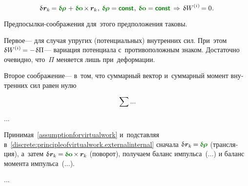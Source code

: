 \begin{otherlanguage}{russian}
\nopagebreak\vspace{-0.2em}\begin{equation}\label{assumptionforvirtualwork}
\variation{\hspace{.1ex}\bm{r}_k} \hspace{-0.16ex}
= \constvarvector{\hspace{-0.1ex}\bm{\rho}} \hspace{.2ex} + \hspace{.12ex} \constvarvector{\bm{o}} \hspace{-0.2ex} \times \hspace{-0.1ex} \bm{r}_k
\hspace{.1ex} , \:
\constvarvector{\hspace{-0.1ex}\bm{\rho}} = \boldconst \hspace{.1ex} , \:
\constvarvector{\bm{o}} = \boldconst
\hspace{.4ex} \Rightarrow \hspace{.32ex}
\variation{\internalwork} \hspace{-0.1ex} = 0 \hspace{.1ex}.
\end{equation}

\vspace{-0.1em} Предпосылки-соображения для~этого предположения таковы.

Первое\:--- для случая упругих (потенциальных) внутренних сил. При~этом ${\variation{\internalwork} = - \hspace{.16ex} \variation{\Pi}}$\:--- вариация потенциала с~противоположным знаком. Достаточно очевидно, что~$\Pi$ меняется лишь при~деформации.

Второе соображение\:--- в~том, что суммарный вектор и~суммарный момент внутренних сил равен нулю

\begin{equation*}
\sum \ldots
\end{equation*}

...

Принимая~\eqref{assumptionforvirtualwork} и~подставляя в~\eqref{discrete:principleofvirtualwork.externalinternal} сначала ${\variation{\hspace{.1ex}\bm{r}_k} \hspace{-0.16ex} = \hspace{-0.08ex} \constvarvector{\hspace{-0.1ex}\bm{\rho}}}$ (трансляция), а~затем ${\variation{\hspace{.1ex}\bm{r}_k} \hspace{-0.16ex} = \hspace{-0.08ex} \constvarvector{\bm{o}} \hspace{-0.2ex} \times \hspace{-0.1ex} \bm{r}_k}$ (поворот), получаем баланс импульса~(...) и баланс момента импульса~(...).

...



\end{otherlanguage}

